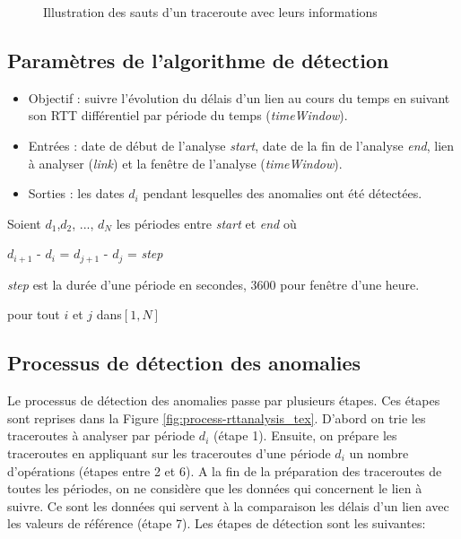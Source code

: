 \begin{figure}[H]
	\centering
	\captionsetup{justification=centering}
	\resizebox{\textwidth}{!}{
	
}
	\caption{Illustration des sauts d'un traceroute avec leurs informations}
	\label{fig:traceroute}
\end{figure}

\subsection{Paramètres de l'algorithme de  détection}

\begin{itemize}
		\item  Objectif : suivre l'évolution du délais d'un lien au cours du temps en suivant son RTT différentiel par période du temps (\textit{timeWindow}).
	\item Entrées : date de début de l'analyse \textit{start}, date de la fin de l'analyse \textit{end}, lien à analyser (\textit{link}) et la fenêtre de l'analyse (\textit{timeWindow}).
	\item Sorties : les dates $d_i$ pendant lesquelles des anomalies ont été détectées.
\end{itemize}

Soient $ d_1 $,$  d_2 $, ..., $ d_N $ les périodes entre \textit{start} et \textit{end} où

\begin{center}
	 $  d_{i+1} $ - $  d_{i} $ = $  d_{j+1} $ - $  d_{j} $ = \textit{step} 
	 
	 \textit{step} est la durée d'une période en secondes, $3600$ pour fenêtre d'une heure.
\end{center}
 
 pour tout $ i $ et $ j $ dans$  [1,N] $
\subsection{Processus de  détection des anomalies }\label{steps-rtt-analysis}

Le processus de  détection des anomalies passe par plusieurs étapes. Ces étapes sont reprises dans  la Figure \ref{fig:process-rttanalysis_tex}. D'abord on  trie les traceroutes à analyser par période $d_i$ (étape 1). Ensuite, on prépare les traceroutes en   appliquant sur les traceroutes d'une période $d_i$ un nombre d'opérations (étapes entre 2 et 6). A la fin de la préparation des traceroutes de toutes les périodes, on ne considère que les données qui concernent le lien à suivre. Ce sont les données qui servent à la comparaison  les  délais d'un lien avec les valeurs de référence (étape 7). Les étapes de détection sont les suivantes:

